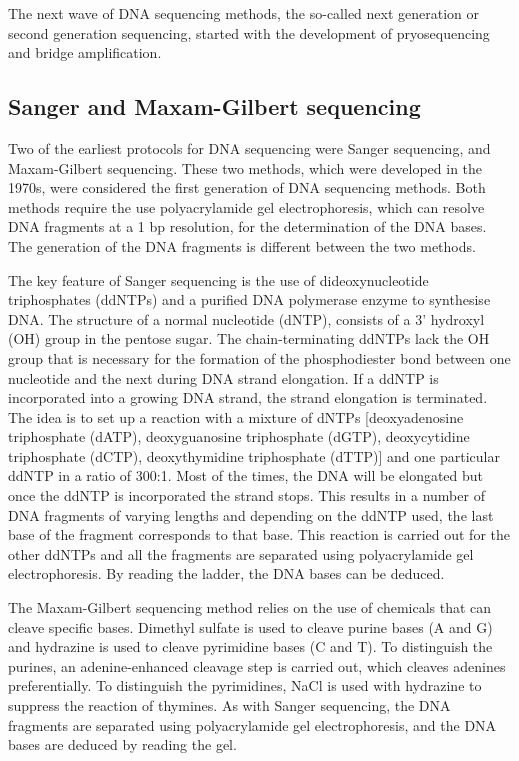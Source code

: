 The next wave of DNA sequencing methods, the so-called next generation or second generation sequencing, started with the development of pryosequencing and bridge amplification.

\subsection{Sanger and Maxam-Gilbert sequencing}

Two of the earliest protocols for DNA sequencing were Sanger sequencing\cite{pmid271968}, and Maxam-Gilbert sequencing\cite{pmid265521}. These two methods, which were developed in the 1970s, were considered the first generation of DNA sequencing methods. Both methods require the use polyacrylamide gel electrophoresis, which can resolve DNA fragments at a 1 bp resolution, for the determination of the DNA bases. The generation of the DNA fragments is different between the two methods.

The key feature of Sanger sequencing is the use of dideoxynucleotide triphosphates (ddNTPs) and a purified DNA polymerase enzyme to synthesise DNA. The structure of a normal nucleotide (dNTP), consists of a 3' hydroxyl (OH) group in the pentose sugar. The chain-terminating ddNTPs lack the OH group that is necessary for the formation of the phosphodiester bond between one nucleotide and the next during DNA strand elongation. If a ddNTP is incorporated into a growing DNA strand, the strand elongation is terminated. The idea is to set up a reaction with a mixture of dNTPs [deoxyadenosine triphosphate (dATP), deoxyguanosine triphosphate (dGTP), deoxycytidine triphosphate (dCTP), deoxythymidine triphosphate (dTTP)] and one particular ddNTP in a ratio of 300:1. Most of the times, the DNA will be elongated but once the ddNTP is incorporated the strand stops. This results in a number of DNA fragments of varying lengths and depending on the ddNTP used, the last base of the fragment corresponds to that base. This reaction is carried out for the other ddNTPs and all the fragments are separated using polyacrylamide gel electrophoresis. By reading the ladder, the DNA bases can be deduced.

The Maxam-Gilbert sequencing method relies on the use of chemicals that can cleave specific bases. Dimethyl sulfate is used to cleave purine bases (A and G) and hydrazine is used to cleave pyrimidine bases (C and T). To distinguish the purines, an adenine-enhanced cleavage step is carried out, which cleaves adenines preferentially. To distinguish the pyrimidines, NaCl is used with hydrazine to suppress the reaction of thymines. As with Sanger sequencing, the DNA fragments are separated using polyacrylamide gel electrophoresis, and the DNA bases are deduced by reading the gel.

